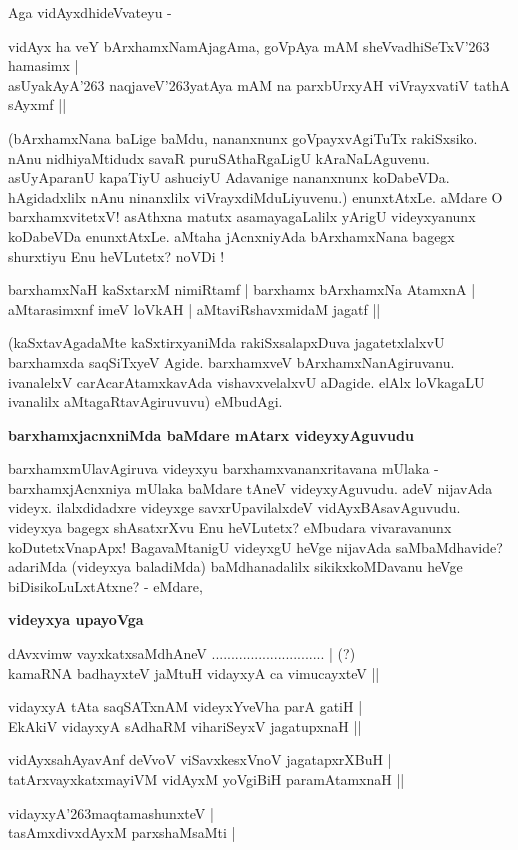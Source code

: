Aga vidAyxdhideVvateyu -

\begin{shloka}
vidAyx ha veY bArxhamxNamAjagAma, goVpAya mAM sheVvadhiSeTxV\char'263 hamasimx |\\\label{85}
asUyakAyA\char'263 naqjaveV\char'263yatAya mAM na parxbUrxyAH viVrayxvatiV tathA sAyxmf ||
\end{shloka}

\noindent
(bArxhamxNana baLige baMdu, nananxnunx goVpayxvAgiTuTx rakiSxsiko. nAnu nidhiyaMtidudx savaR puruSAthaRgaLigU kAraNaLAguvenu. asUyAparanU kapaTiyU ashuciyU Adavanige nananxnunx koDabeVDa. hAgidadxlilx nAnu ninanxlilx viVrayxdiMduLiyuvenu.) enunxtAtxLe. aMdare O barxhamxvitetxV!  asAthxna matutx asamayagaLalilx yArigU videyxyanunx koDabeVDa enunxtAtxLe. aMtaha jAcnxniyAda bArxhamxNana bagegx shurxtiyu Enu heVLutetx? noVDi !

\begin{shloka}
barxhamxNaH kaSxtarxM nimiRtamf | barxhamx bArxhamxNa AtamxnA |\\\label{85a}
aMtarasimxnf imeV loVkAH | aMtaviRshavxmidaM jagatf ||
\end{shloka}

\noindent
(kaSxtavAgadaMte kaSxtirxyaniMda rakiSxsalapxDuva jagatetxlalxvU barxhamxda saqSiTxyeV Agide. barxhamxveV bArxhamxNanAgiruvanu. ivanalelxV carAcarAtamxkavAda vishavxvelalxvU aDagide. elAlx loVkagaLU ivanalilx aMtagaRtavAgiruvuvu) eMbudAgi. 

{\bigskip
\noindent
{\large\bf barxhamxjacnxniMda baMdare mAtarx videyxyAguvudu}}\label{page85a}
\medskip

\noindent
barxhamxmUlavAgiruva videyxyu barxhamxvananxritavana mUlaka - barxhamxjAcnxniya mUlaka baMdare tAneV videyxyAguvudu. adeV nijavAda videyx. ilalxdidadxre videyxge savxrUpavilalxdeV vidAyxBAsavAguvudu. videyxya bagegx shAsatxrXvu Enu heVLutetx? eMbudara vivaravanunx koDutetxVnapApx! BagavaMtanigU videyxgU heVge nijavAda saMbaMdhavide? adariMda (videyxya baladiMda) baMdhanadalilx sikikxkoMDavanu heVge biDisikoLuLxtAtxne? - eMdare,

{\bigskip
\noindent
{\large\bf videyxya upayoVga}}\label{page86}

\begin{shloka}
dAvxvimw vayxkatxsaMdhAneV ............................. | (?)\\\label{86}
kamaRNA badhayxteV jaMtuH vidayxyA ca vimucayxteV ||
\end{shloka}

\begin{shloka}
vidayxyA tAta saqSATxnAM videyxYveVha parA gatiH |\\\label{86a}
EkAkiV vidayxyA sAdhaRM vihariSeyxV jagatupxnaH ||\\\label{86b}

vidAyxsahAyavAnf deVvoV viSavxkesxVnoV jagatapxrXBuH |\\\label{86c}
tatArxvayxkatxmayiVM vidAyxM yoVgiBiH paramAtamxnaH ||\\\label{86d}

vidayxyA\char'263maqtamashunxteV |\\\label{86e}
tasAmxdivxdAyxM parxshaMsaMti |\label{86f}
\end{shloka}

